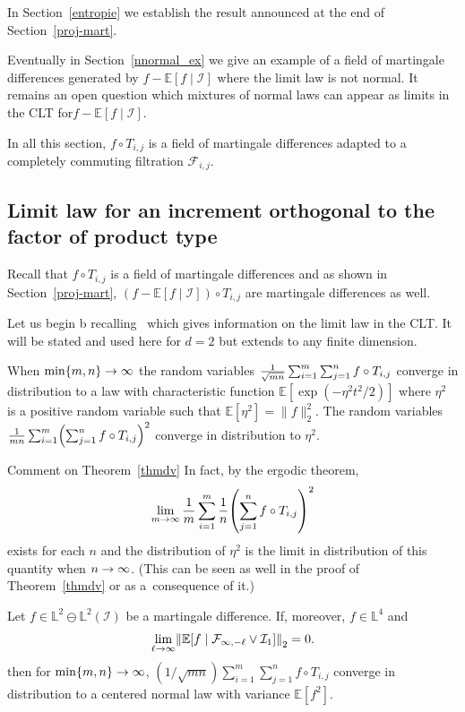 \documentclass[AHL,Unicode,longabstracts,published]{cedram}
\newcommand*\bbL{\mathbb{L}}
\newcommand{\bbE}{\mathbb{E}}
\newcommand{\E}[1]{\bbE\left[#1\right]}
\newcommand*\I{\mathcal{I}}
\newcommand*\F{\mathcal{F}}
\newcommand{\norm}[1]{\left\lVert #1\right\rVert}
\renewcommand*{\to}{\mathchoice{\longrightarrow}{\rightarrow}{\rightarrow}{\rightarrow}}
\let\originalleft\left
\let\originalright\right
\renewcommand{\left}{\mathopen{}\mathclose\bgroup\originalleft}
\renewcommand{\right}{\aftergroup\egroup\originalright}
\begin{document}
In Section~\ref{entropie} we establish the result announced at the end of Section~\ref{proj-mart}.

Eventually in Section~\ref{nnormal_ex} we give an example of a field of martingale differences generated by $f - \bbE[f \mid \I]$ where the limit law is not normal. It remains an open question which mixtures of normal laws can appear as limits in the CLT for\linebreak $f - \bbE[f \mid \I]$.

In all this section, $f\circ T_{i,j}$ is a field of martingale differences adapted to a completely commuting filtration $\F_{i,j}$.

\subsection{Limit law for an increment orthogonal to the factor of product type}\label{queue-property}

Recall that $f\circ T_{i,j}$ is a field of martingale differences and as shown in Section~\ref{proj-mart}, $(f - \bbE[f \mid \I])\circ T_{i,j}$ are martingale differences as well.

Let us begin b recalling~\cite[Theorem~1]{MR3913270} which gives information on the limit law in the CLT. It will be stated and used here for $d=2$ but extends to any finite dimension.
\begin{theo}\label{thmdv}
When $\min\{m,n\}\to\infty$ the random variables $\frac1{\sqrt{mn}}\sum_{i=1}^m\sum_{j=1}^n \linebreak f\circ T_{i,j}$ converge in distribution to a law with characteristic function $\bbE[\exp(-\eta^2t^2/2)]$ where $\eta^2$ is a positive random variable such that $\bbE[\eta^2]=\|f\|_2^2$. The random variables $\frac1{mn}\sum_{i=1}^m\left(\sum_{j=1}^n f\circ T_{i,j}\right)^2$ converge in distribution to $\eta^2$.
\end{theo}

\begin{enonce*}[remark]{Comment on Theorem~\ref{thmdv}}
In fact, by the ergodic theorem,
\[
\lim_{m\to\infty}\frac1{m}\sum_{i=1}^m\frac1n\left(\sum_{j=1}^n f\circ
T_{i,j}\right)^2
\]
exists for each $n$ and the distribution of $\eta^2$ is the
limit in distribution of this quantity when $n\to\infty$. (This can be seen as well in the proof of Theorem~\ref{thmdv} or as a~consequence of it.)
\end{enonce*}
\begin{prop}\label{queue-condition}
Let $f\in \bbL^2\ominus \bbL^2(\I)$ be a martingale difference. If, moreover, $f\in\bbL^4$ and
\begin{equation}\label{eq:hyp_pour_avoir_loi_normale}
\lim_{\ell\to\infty}
\norm{
\E{f\mid\F_{\infty, -\ell}\vee \I_1 }}_2=0.
\end{equation}
then for $\min\{m,n\} \to\infty$, $(1/\sqrt{mn}) \sum_{i=1}^m\sum_{j=1}^n f\circ T_{i,j}$ converge in distribution to a centered normal law with variance $\bbE[f^2]$.
\end{prop}
\end{document}

